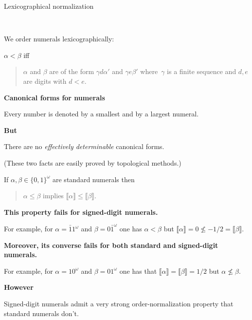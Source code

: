 \documentclass{csslides-1.1}
\newcommand{\Meaning}[1]{\llbracket #1 \rrbracket}
\newcommand{\twomega}{\{0,1\}^{\omega}}
\newcommand{\myemph}[1]{{\it #1}\/}
\begin{document}
\begin{slide}{Lexicographical normalization}

~ \vfill

We order numerals lexicographically:

\vfill

$\alpha < \beta$ iff 
\begin{quote}
  $\alpha$ and $\beta$ are of the form $\gamma d \alpha'$ and $\gamma
  e \beta'$ where~$\gamma$ is a finite sequence and $d,e$ are digits
  with $d<e$.
\end{quote}
\vfill

{\bf Canonical forms for numerals}

Every number is denoted by a smallest and by a largest numeral.

\vfill

{\bf But}

There are no \myemph{effectively determinable} canonical forms.

\vfill

(These two facts are easily proved by topological methods.)

\vfill

\end{slide}


\begin{slide}{}

\vfill

  If $\alpha,\beta \in \twomega$ are standard numerals then
\begin{quote}
  $\alpha \leqslant \beta$ implies
  $\Meaning{\alpha} \leqslant \Meaning{\beta}$.
\end{quote}

\vfill

{\bf This property fails for signed-digit numerals.}

For example, for
$\alpha=\bar{1}1^\omega$ and $\beta=0\bar{1}^\omega$ one has
$\alpha<\beta$ but $\Meaning{\alpha}=0 \not\leqslant -1/2 =
\Meaning{\beta}$.  

\vfill

{\bf Moreover, its converse fails for both standard and signed-digit
  numerals.}

For example, for $\alpha=10^{\omega}$ and
$\beta=01^{\omega}$ one has that
$\Meaning{\alpha}=\Meaning{\beta}=1/2$ but $\alpha \not\leqslant
\beta$.  

\vfill

{\bf However} 

Signed-digit numerals admit a very strong order-normalization property
that standard numerals don't.

\vfill

\end{slide}
\end{document}
